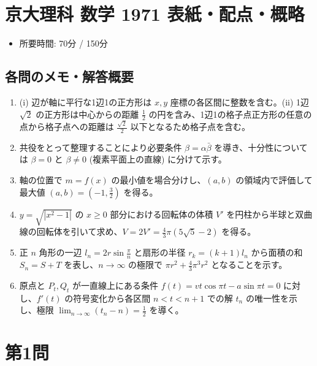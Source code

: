 \documentclass[../main.tex]{subfiles}
\begin{document}
\section*{京大理科 数学 1971 表紙・配点・概略}

\begin{itemize}
  \item 所要時間: 70分 / 150分
\end{itemize}

\subsection*{各問のメモ・解答概要}
\begin{enumerate}
  \item (i) 辺が軸に平行な1辺1の正方形は $x, y$ 座標の各区間に整数を含む。(ii) 1辺 $\sqrt{2}$ の正方形は中心からの距離 $\frac{1}{2}$ の円を含み、1辺1の格子点正方形の任意の点から格子点への距離は $\frac{\sqrt{2}}{2}$ 以下となるため格子点を含む。
  \item 共役をとって整理することにより必要条件 $\beta = \alpha \bar{\beta}$ を導き、十分性については $\beta = 0$ と $\beta \neq 0$ (複素平面上の直線) に分けて示す。
  \item 軸の位置で $m = f(x)$ の最小値を場合分けし、$(a, b)$ の領域内で評価して最大値 $(a, b) = \left(-1, \frac{3}{2}\right)$ を得る。
  \item $y = \sqrt{|x^2 - 1|}$ の $x \ge 0$ 部分における回転体の体積 $V'$ を円柱から半球と双曲線の回転体を引いて求め、$V = 2V' = \frac{4}{3}\pi (5\sqrt{5} - 2)$ を得る。
  \item 正 $n$ 角形の一辺 $l_n = 2r \sin \frac{\pi}{n}$ と扇形の半径 $r_k = (k+1)l_n$ から面積の和 $S_n = S + T$ を表し、$n \to \infty$ の極限で $\pi r^2 + \frac{4}{3}\pi^3 r^2$ となることを示す。
  \item 原点と $P_t, Q_t$ が一直線上にある条件 $f(t) = vt\cos\pi t - a\sin\pi t = 0$ に対し、$f'(t)$ の符号変化から各区間 $n < t < n+1$ での解 $t_n$ の唯一性を示し、極限 $\lim_{n\to\infty}(t_n - n) = \frac{1}{2}$ を導く。
\end{enumerate}

\newpage

\section*{第1問}

\noindent
[\textbf{解}]
\end{document}
